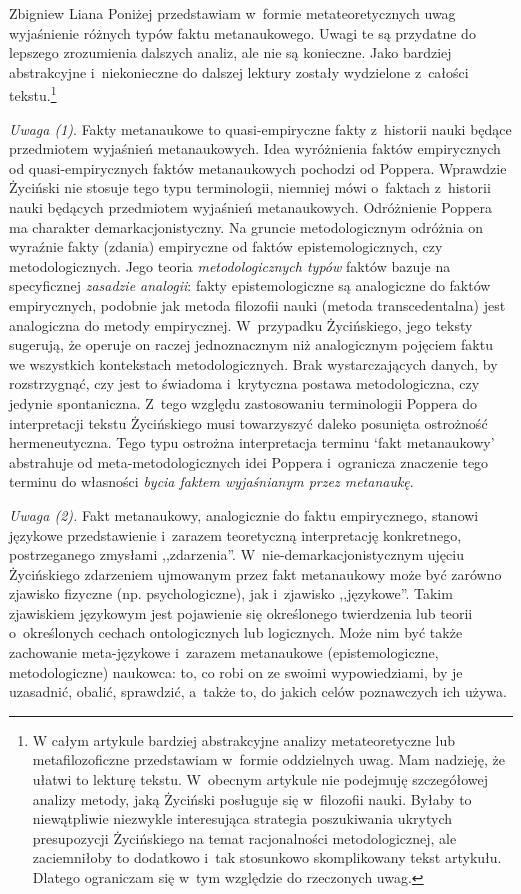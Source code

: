 \begin{artplenv}{Zbigniew Liana}
Poniżej przedstawiam w~formie metateoretycznych uwag wyjaśnienie różnych typów faktu metanaukowego. Uwagi te są
przydatne do lepszego zrozumienia dalszych analiz, ale nie są konieczne. Jako bardziej abstrakcyjne i~niekonieczne do
dalszej lektury zostały wydzielone z~całości tekstu.\footnote{W całym artykule bardziej abstrakcyjne analizy
metateoretyczne lub metafilozoficzne przedstawiam w~formie oddzielnych uwag. Mam nadzieję, że ułatwi to lekturę
tekstu. W~obecnym artykule nie podejmuję szczegółowej analizy metody, jaką Życiński posługuje się w~filozofii nauki. Byłaby to
niewątpliwie niezwykle interesująca strategia poszukiwania ukrytych presupozycji Życińskiego na temat racjonalności
metodologicznej, ale zaciemniłoby to dodatkowo i~tak stosunkowo skomplikowany tekst artykułu. Dlatego ograniczam się w~tym
względzie do rzeczonych uwag.}

\textit{Uwaga (1)}. Fakty metanaukowe to quasi-empiryczne fakty z~historii nauki będące przedmiotem wyjaśnień
metanaukowych. Idea wyróżnienia faktów empirycznych od quasi-empirycznych faktów metanaukowych pochodzi od Poppera.
Wprawdzie Życiński nie stosuje tego typu terminologii, niemniej mówi o~faktach z~historii nauki będących przedmiotem
wyjaśnień metanaukowych. Odróżnienie Poppera ma charakter demarkacjonistyczny. Na gruncie metodologicznym odróżnia on
wyraźnie fakty (zdania) empiryczne od faktów epistemologicznych, czy metodologicznych. Jego teoria
\textit{metodologicznych typów} faktów bazuje na specyficznej \textit{zasadzie analogii}: fakty epistemologiczne są
analogiczne do faktów empirycznych, podobnie jak metoda filozofii nauki (metoda transcedentalna) jest analogiczna do
metody empirycznej. W~przypadku Życińskiego, jego teksty sugerują, że operuje on raczej jednoznacznym niż analogicznym
pojęciem faktu we wszystkich kontekstach metodologicznych. Brak wystarczających danych, by rozstrzygnąć, czy jest to
świadoma i~krytyczna postawa metodologiczna, czy jedynie spontaniczna. Z~tego względu zastosowaniu terminologii Poppera
do interpretacji tekstu Życińskiego musi towarzyszyć daleko posunięta ostrożność hermeneutyczna. Tego typu ostrożna
interpretacja terminu `fakt metanaukowy' abstrahuje od meta-metodologicznych idei Poppera i~ogranicza znaczenie tego
terminu do własności \textit{bycia faktem wyjaśnianym przez metanaukę}.

\textit{Uwaga (2).} Fakt metanaukowy, analogicznie do faktu empirycznego, stanowi językowe przedstawienie i~zarazem
teoretyczną interpretację konkretnego, postrzeganego zmysłami ,,zdarzenia''. W~nie-demarkacjonistycznym ujęciu
Życińskiego zdarzeniem ujmowanym przez fakt metanaukowy może być zarówno zjawisko fizyczne (np. psychologiczne), jak i~zjawisko
,,językowe''. Takim zjawiskiem językowym jest pojawienie się określonego twierdzenia lub teorii o~określonych
cechach ontologicznych lub logicznych. Może nim być także zachowanie meta-językowe i~zarazem metanaukowe
(epistemologiczne, metodologiczne) naukowca: to, co robi on ze swoimi wypowiedziami, by je uzasadnić, obalić,
sprawdzić, a~także to, do jakich celów poznawczych ich używa.


\end{artplenv}
